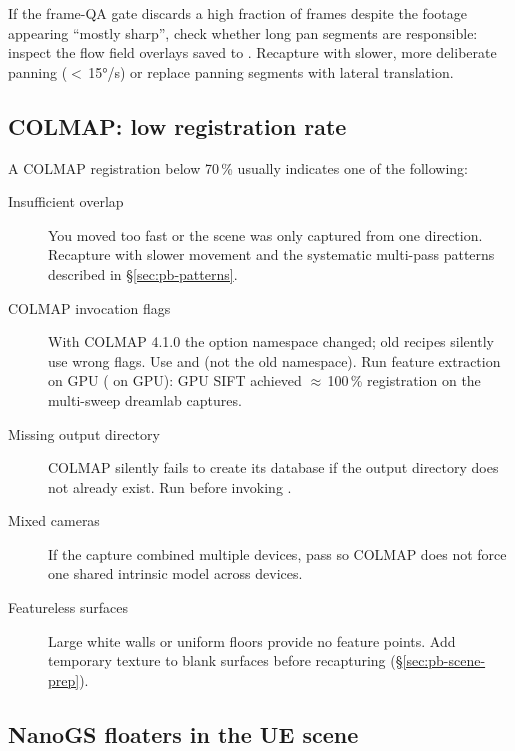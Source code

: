 If the frame-QA gate discards a high fraction of frames despite the footage
appearing ``mostly sharp'', check whether long pan segments are responsible:
inspect the flow field overlays saved to .
Recapture with slower, more deliberate panning ($<$\,15°/s) or replace panning
segments with lateral translation.

\subsection{COLMAP: low registration rate}
\label{sec:pb-ts-colmap}

A COLMAP registration below 70\,\% usually indicates one of the following:

\begin{description}
  \item[Insufficient overlap] You moved too fast or the scene was only captured
    from one direction.  Recapture with slower movement and the systematic
    multi-pass patterns described in \S\ref{sec:pb-patterns}.
  \item[COLMAP invocation flags] With COLMAP 4.1.0 the option namespace changed;
    old recipes silently use wrong flags.  Use  and
     (not the old  namespace).
    Run feature extraction on GPU ( on GPU):
    GPU SIFT achieved $\approx$\,100\,\% registration on the multi-sweep
    dreamlab captures.
  \item[Missing output directory] COLMAP silently fails to create its database if
    the output directory does not already exist.  Run
     before invoking .
  \item[Mixed cameras] If the capture combined multiple devices, pass
     so COLMAP does not force
    one shared intrinsic model across devices.
  \item[Featureless surfaces] Large white walls or uniform floors provide no
    feature points.  Add temporary texture to blank surfaces before
    recapturing (\S\ref{sec:pb-scene-prep}).
\end{description}

\subsection{NanoGS floaters in the UE scene}
\label{sec:pb-ts-floaters}

